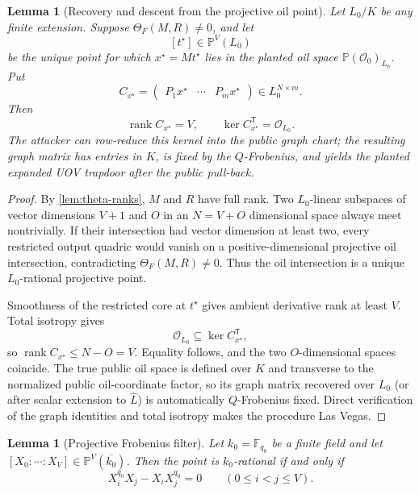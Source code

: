\documentclass[10pt,a4paper]{article}
\newtheorem{lemma}[theorem]{Lemma}
\newcommand{\F}{\mathbb F}
\newcommand{\PP}{\mathbb P}
\newcommand{\cO}{\mathcal O}
\newcommand{\rank}{\operatorname{rank}}
\begin{document}
\begin{lemma}[Recovery and descent from the projective oil point]\label{lem:descent}
Let $L_0/K$ be any finite extension.  Suppose $\Theta_F(M,R)\ne0$, and let
\[
[t^\star]\in\PP^V(L_0)
\]
be the unique point for which $x^\star=Mt^\star$ lies in the planted oil space $\PP(\cO_0)_{L_0}$.  Put
\[
C_{x^\star}=
\begin{pmatrix}P_1x^\star&\cdots&P_mx^\star\end{pmatrix}
\in L_0^{N\times m}.
\]
Then
\[
\rank C_{x^\star}=V,
\qquad
\ker C_{x^\star}^{\mathsf T}=\cO_{L_0}.
\]
The attacker can row-reduce this kernel into the public graph chart; the resulting graph matrix has entries in $K$, is fixed by the $Q$-Frobenius, and yields the planted expanded UOV trapdoor after the public pull-back.
\end{lemma}

\begin{proof}
By \cref{lem:theta-ranks}, $M$ and $R$ have full rank.  Two $L_0$-linear subspaces of vector dimensions $V+1$ and $O$ in an $N=V+O$ dimensional space always meet nontrivially.  If their intersection had vector dimension at least two, every restricted output quadric would vanish on a positive-dimensional projective oil intersection, contradicting $\Theta_F(M,R)\ne0$.  Thus the oil intersection is a unique $L_0$-rational projective point.

Smoothness of the restricted core at $t^\star$ gives ambient derivative rank at least $V$.  Total isotropy gives
\[
\cO_{L_0}\subseteq\ker C_{x^\star}^{\mathsf T},
\]
so $\rank C_{x^\star}\le N-O=V$.  Equality follows, and the two $O$-dimensional spaces coincide.  The true public oil space is defined over $K$ and transverse to the normalized public oil-coordinate factor, so its graph matrix recovered over $L_0$ (or after scalar extension to $\widehat L$) is automatically $Q$-Frobenius fixed.  Direct verification of the graph identities and total isotropy makes the procedure Las Vegas.
\end{proof}

\begin{lemma}[Projective Frobenius filter]\label{lem:projective-frobenius}
Let $k_0=\F_{q_0}$ be a finite field and let $[X_0:\cdots:X_V]\in\PP^V(\overline{k_0})$.  Then the point is $k_0$-rational if and only if
\begin{equation}\label{eq:projective-frobenius}
X_i^{q_0}X_j-X_iX_j^{q_0}=0
\qquad(0\le i<j\le V).
\end{equation}
\end{lemma}
\end{document}
